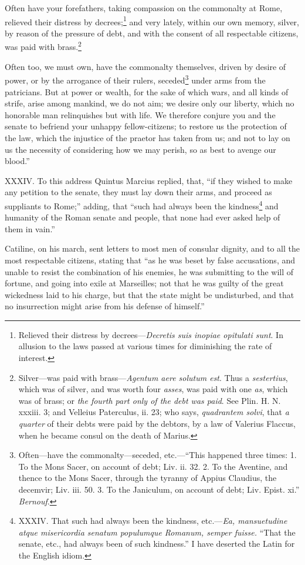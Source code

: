 Often have your forefathers, taking compassion on the commonalty at
Rome, relieved their distress by decrees;\footnote{Relieved their distress by decrees—\emph{Decretis suis inopiae
opitulati sunt}. In allusion to the laws passed at various times for
diminishing the rate of interest.} and very lately, within
our own memory, silver, by reason of the pressure of debt, and with
the consent of all respectable citizens, was paid with brass.\footnote{Silver—was paid with brass—\emph{Agentum aere solutum est}.
Thus a \emph{sestertius}, which was of silver, and was worth four \emph{asses},
was paid with one \emph{as}, which was of brass; or \emph{the fourth part only
of the debt was paid}. See Plin. H. N. xxxiii. 3; and Velleius
Paterculus, ii. 23; who says, \emph{quadrantem solvi}, that \emph{a quarter} of
their debts were paid by the debtors, by a law of Valerius Flaccus,
when he became consul on the death of Marius.}

Often too, we must own, have the commonalty themselves, driven by
desire of power, or by the arrogance of their rulers, seceded\footnote{Often—have the commonalty—seceded, etc.—``This happened
three times: 1. To the Mons Sacer, on account of debt; Liv. ii. 32. 2.
To the Aventine, and thence to the Mons Sacer, through the tyranny of
Appius Claudius, the decemvir; Liv. iii. 50. 3. To the Janiculum, on
account of debt; Liv. Epist. xi.'' \emph{Bernouf}.}
under arms from the patricians. But at power or wealth, for the sake
of which wars, and all kinds of strife, arise among mankind, we do not
aim; we desire only our liberty, which no honorable man relinquishes
but with life. We therefore conjure you and the senate to befriend
your unhappy fellow-citizens; to restore us the protection of the law,
which the injustice of the praetor has taken from us; and not to lay
on us the necessity of considering how we may perish, so as best to
avenge our blood.''

XXXIV. To this address Quintus Marcius replied, that, ``if they wished
to make any petition to the senate, they must lay down their arms, and
proceed as suppliants to Rome;'' adding, that ``such had always been the
kindness\footnote{XXXIV. That such had always been the kindness, etc.—\emph{Ea,
mansuetudine atque misericordia senatum populumque Romanum, semper
fuisse.} ``That the senate, etc., had always been of such kindness.'' I
have deserted the Latin for the English idiom.} and humanity of the Roman senate and people, that none
had ever asked help of them in vain.''

Catiline, on his march, sent letters to most men of consular dignity,
and to all the most respectable citizens, stating that ``as he was
beset by false accusations, and unable to resist the combination of
his enemies, he was submitting to the will of fortune, and going into
exile at Marseilles; not that he was guilty of the great wickedness
laid to his charge, but that the state might be undisturbed, and that
no insurrection might arise from his defense of himself.''

